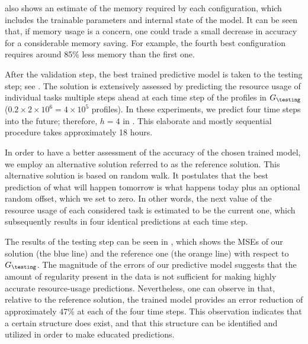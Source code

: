  also shows an estimate of the memory required by each
configuration, which includes the trainable parameters and internal state of the
model. It can be seen that, if memory usage is a concern, one could trade a
small decrease in accuracy for a considerable memory saving. For example, the
fourth best configuration requires around 85\% less memory than the first one.

After the validation step, the best trained predictive model is taken to the
testing step; see . The solution is extensively assessed by
predicting the resource usage of individual tasks multiple steps ahead at each
time step of the profiles in $G_\testing$ ($0.2 \times 2 \times 10^6 = 4 \times
10^5$ profiles). In these experiments, we predict four time steps into the
future; therefore, $h = 4$ in . This elaborate and mostly
sequential procedure takes approximately 18 hours.

In order to have a better assessment of the accuracy of the chosen trained
model, we employ an alternative solution referred to as the reference solution.
This alternative solution is based on random walk. It postulates that the best
prediction of what will happen tomorrow is what happens today plus an optional
random offset, which we set to zero. In other words, the next value of the
resource usage of each considered task is estimated to be the current one, which
subsequently results in four identical predictions at each time step.

The results of the testing step can be seen in , which shows
the \acp{MSE} of our solution (the blue line) and the reference one (the orange
line) with respect to $G_\testing$. The magnitude of the errors of our
predictive model suggests that the amount of regularity present in the data is
not sufficient for making highly accurate resource-usage predictions.
Nevertheless, one can observe in  that, relative to the
reference solution, the trained model provides an error reduction of
approximately 47\% at each of the four time steps. This observation indicates
that a certain structure does exist, and that this structure can be identified
and utilized in order to make educated predictions.
